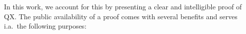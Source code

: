 \documentclass[]{elsarticle}
\begin{document}
	In this work, we account for this by presenting 
	a clear and intelligible proof of QX. 
	The public availability of a proof comes with several benefits and serves i.a.\ the following purposes:
\end{document}
